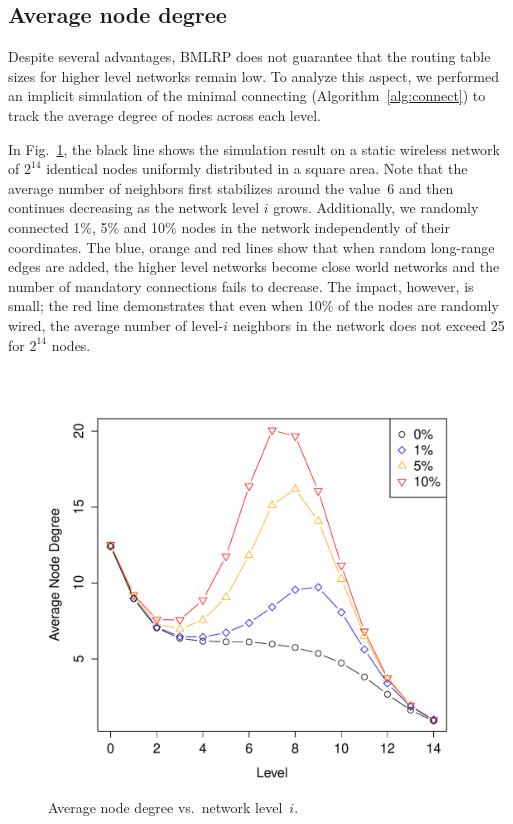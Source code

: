 \documentclass[conference]{IEEEtran}
\theoremstyle{definition}
\begin{document}
\subsection{Average node degree}
\label{sec:analysis:nodedegree}

Despite several advantages, BMLRP does not guarantee that the routing table sizes for higher level networks remain low. To analyze this aspect, we performed an implicit simulation of the minimal connecting 
(Algorithm~\ref{alg:connect}) to track the average degree of nodes across each level.

In Fig.~\ref{fig:degrees}, the black line shows the simulation result on a static wireless network of $2^{14}$ identical nodes uniformly distributed in a square area. Note that the average number of neighbors first stabilizes around 
the value~6 and then continues decreasing as the network level $i$ grows. Additionally, we randomly connected 1\%, 5\% and 10\% nodes in the network independently of their coordinates. The blue, orange and red lines show that when random long-range edges are added, the higher level networks become close world networks and the number of mandatory connections fails to decrease. The impact, however, is small; the red line demonstrates that even when 10\% of the nodes are randomly wired, the average number of level-$i$ neighbors in the network does not exceed 25 for $2^{14}$ nodes.

\begin{figure}[H]
   \includegraphics[width=0.95\linewidth]{degrees}

   \caption{Average node degree vs.\ network level~$i$.}
    \label{fig:degrees}
\end{figure}
\end{document}

